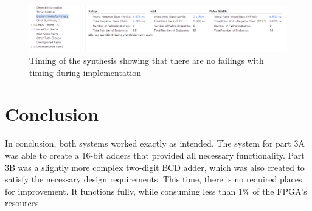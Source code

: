 \documentclass[12pt,a4paper]{article}
\begin{document}
\begin{figure}[H]
    \centering
    \includegraphics[scale=0.25]{images/synthesis_timing.png}
    \caption{Timing of the synthesis showing that there are no failings with timing during implementation}
    \label{fig:timing}
\end{figure}

\section{Conclusion}

In conclusion, both systems worked exactly as intended. The system for part 3A was able to create a 16-bit adders that provided all necessary functionality. Part 3B was a slightly more complex two-digit BCD adder, which was also created to satisfy the necessary design requirements. This time, there is no required places for improvement. It functions fully, while consuming less than 1$\%$ of the FPGA's resources. 
\end{document}
